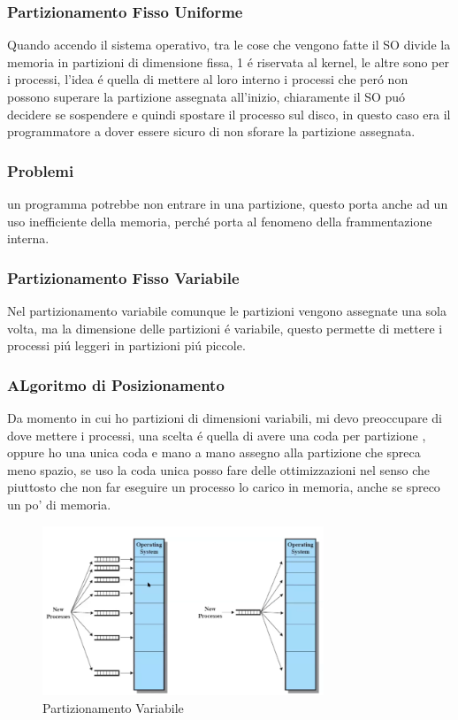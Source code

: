     \subsubsection{Partizionamento Fisso Uniforme}
    Quando accendo il sistema operativo, tra le cose che vengono fatte il SO divide la memoria in partizioni di dimensione
    fissa, 1 é riservata al kernel, le altre sono per i processi, l'idea é quella di mettere al loro interno i processi
    che peró non possono superare la partizione assegnata all'inizio, chiaramente il SO puó decidere se sospendere
    e quindi spostare il processo sul disco, in questo caso era il programmatore a dover essere sicuro di non sforare
    la partizione assegnata.
    \subsubsection*{Problemi}
    un programma potrebbe non entrare in una partizione, questo porta anche ad un uso inefficiente della memoria, perché
    porta al fenomeno della frammentazione interna.
    \subsubsection{Partizionamento Fisso Variabile}
    Nel partizionamento variabile comunque le partizioni vengono assegnate una sola volta, ma la dimensione delle partizioni
    é variabile, questo permette di mettere i processi piú leggeri in partizioni piú piccole.
    \subsubsection*{ALgoritmo di Posizionamento}
    Da momento in cui ho partizioni di dimensioni variabili, mi devo preoccupare di dove mettere i processi, una scelta
    é quella di avere una coda per partizione , oppure ho una unica coda e mano a mano assegno alla partizione che spreca
    meno spazio, se uso la coda unica posso fare delle ottimizzazioni nel senso che piuttosto che non far eseguire un
    processo lo carico in memoria, anche se spreco un po' di memoria.
    \begin{figure}[H]
        \centering
        \includegraphics[width=0.75\textwidth]{immagini/partizionamento}
        \caption{Partizionamento Variabile}
    \end{figure}
